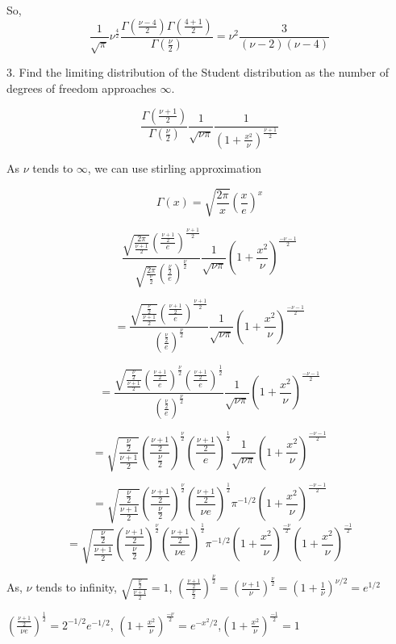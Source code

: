 \documentclass{article}
\begin{document}
So, 
$$  \frac{1}{\sqrt{ \pi}} \nu^{\frac{4}{2}} \frac{\Gamma(\frac{\nu-4}{2})\Gamma(\frac{4+1}{2})}{\Gamma(\frac{\nu}{2})} =\nu^{2} \frac{ 3 }{{(\nu-2)} {(\nu-4)}} $$


3. Find the limiting distribution of the Student distribution as the number of degrees of freedom approaches $\infty$.


$$\frac{\Gamma(\frac{\nu+1}{2})}{\Gamma(\frac{\nu}{2})} \frac{1}{\sqrt{\nu \pi}} \frac{1}{(1+\frac{x^2}{\nu})^{\frac{\nu+1}{2}}}$$

As $\nu$ tends to $\infty$, we can use stirling approximation 

$$\Gamma(x) = \sqrt{\frac{2\pi}{x}}(\frac{x}{e})^{x}$$

$$\frac{\sqrt{\frac{2\pi}{\frac{\nu+1}{2}}}(\frac{\frac{\nu+1}{2}}{e})^{\frac{\nu+1}{2}}}{\sqrt{\frac{2\pi}{\frac{\nu}{2}}}(\frac{\frac{\nu}{2}}{e})^{\frac{\nu}{2}}} \frac{1}{\sqrt{\nu \pi}} {(1+\frac{x^2}{\nu})^{\frac{-\nu-1}{2}}} $$

$$=\frac{\sqrt{\frac{{\frac{\nu}{2}}}{\frac{\nu+1}{2}}}(\frac{\frac{\nu+1}{2}}{e})^{\frac{\nu+1}{2}}}{(\frac{\frac{\nu}{2}}{e})^{\frac{\nu}{2}}} \frac{1}{\sqrt{\nu \pi}} {(1+\frac{x^2}{\nu})^{\frac{-\nu-1}{2}}} $$

$$=\frac{\sqrt{\frac{{\frac{\nu}{2}}}{\frac{\nu+1}{2}}}(\frac{\frac{\nu+1}{2}}{e})^{\frac{\nu}{2}} (\frac{\frac{\nu+1}{2}}{e})^{\frac{1}{2}} }{(\frac{\frac{\nu}{2}}{e})^{\frac{\nu}{2}}} \frac{1}{\sqrt{\nu \pi}} {(1+\frac{x^2}{\nu})^{\frac{-\nu-1}{2}}} $$

$$={\sqrt{\frac{{\frac{\nu}{2}}}{\frac{\nu+1}{2}}}(\frac{\frac{\nu+1}{2}}{\frac{\nu}{2}})^{\frac{\nu}{2}} (\frac{\frac{\nu+1}{2}}{e})^{\frac{1}{2}} } \frac{1}{\sqrt{\nu \pi}} {(1+\frac{x^2}{\nu})^{\frac{-\nu-1}{2}}} $$

$$={\sqrt{\frac{{\frac{\nu}{2}}}{\frac{\nu+1}{2}}}(\frac{\frac{\nu+1}{2}}{\frac{\nu}{2}})^{\frac{\nu}{2}} (\frac{\frac{\nu+1}{2}}{\nu e})^{\frac{1}{2}} } {{ \pi}}^{-1/2} {(1+\frac{x^2}{\nu})^{\frac{-\nu-1}{2}}} $$
$$={\sqrt{\frac{{\frac{\nu}{2}}}{\frac{\nu+1}{2}}}(\frac{\frac{\nu+1}{2}}{\frac{\nu}{2}})^{\frac{\nu}{2}} (\frac{\frac{\nu+1}{2}}{\nu e})^{\frac{1}{2}} } {{ \pi}}^{-1/2} {(1+\frac{x^2}{\nu})^{\frac{-\nu}{2}}} {(1+\frac{x^2}{\nu})^{\frac{-1}{2}}} $$

As, $\nu$ tends to infinity, $\sqrt{\frac{{\frac{\nu}{2}}}{\frac{\nu+1}{2}}} = 1$, $(\frac{\frac{\nu+1}{2}}{\frac{\nu}{2}})^{\frac{\nu}{2}} = (\frac{{\nu+1}}{{\nu}})^{\frac{\nu}{2}}=(1+\frac{1}{\nu})^{\nu/2} = e^{1/2}$

$(\frac{\frac{\nu+1}{2}}{\nu e})^{\frac{1}{2}} = 2^{-1/2} e^{-1/2}$, ${(1+\frac{x^2}{\nu})^{\frac{-\nu}{2}}} = e^{-x^2/2}$,${(1+\frac{x^2}{\nu})^{\frac{-1}{2}}}  = 1$
\end{document}
